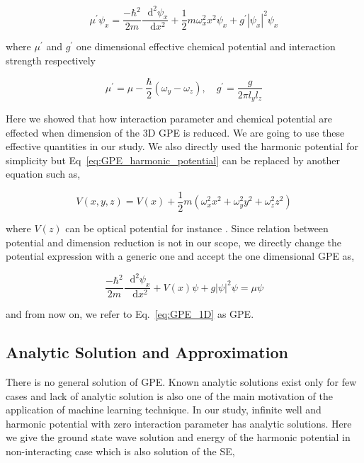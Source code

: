 \documentclass[a4paper,times,hidelinks,12pt]{article}
\newcommand*\dif{\mathop{}\!\mathrm{d}}
\begin{document}
\begin{equation}
\label{eq:GPE_1D_harmonic}
\mu^{\prime}\psi_x = \frac{-\hbar^2}{2m}\frac{\dif^2\psi_x}{\dif x^2} + \frac{1}{2}m\omega_x^2 x^2\psi_x + g^{\prime}|\psi_x|^2\psi_x 
\end{equation}

\noindent where $\mu^{\prime}$ and $g^{\prime}$ one dimensional effective chemical potential and interaction strength respectively

\begin{equation}
\label{eq:GPE_1D_chem_inter}
\mu^{\prime} = \mu - \frac{\hbar}{2}(\omega_y - \omega_z), \quad g^{\prime} = \frac{g}{2\pi l_y l_z}
\end{equation}

\noindent Here we showed that how interaction parameter and chemical potential are effected when dimension of the 3D GPE is reduced. We are going to use these effective quantities in our study. We also directly used the harmonic potential for simplicity but Eq~\eqref{eq:GPE_harmonic_potential} can be replaced by another equation such as,

\begin{equation}
\label{eq:GPE_harmonic_potential_plus_pot}
V(x, y, z) = V(x) + \frac{1}{2}m(\omega_x^2 x^2 + \omega_y^2y^2 + \omega_z^2z^2)
\end{equation}

\noindent where $V(z)$ can be optical potential for instance \cite{zheng2013dynamics}. Since relation between potential and dimension reduction is not in our scope, we directly change the potential expression with a generic one and accept the one dimensional GPE as,

\begin{equation}
    \label{eq:GPE_1D}
    \frac{-\hbar^2}{2m}\frac{\dif^2\psi_x}{\dif x^2} + V(x)\psi + g|\psi|^2\psi = \mu\psi
\end{equation}

\noindent and from now on, we refer to Eq.~\eqref{eq:GPE_1D} as GPE.

\subsection{Analytic Solution and Approximation}

There is no general solution of GPE. Known analytic solutions exist only for few cases and lack of analytic solution is also one of the main motivation of the application of machine learning technique. In our study, infinite well and harmonic potential with zero interaction parameter has analytic solutions. Here we give the ground state wave solution and energy of the harmonic potential in non-interacting case which is also solution of the SE,
\end{document}
